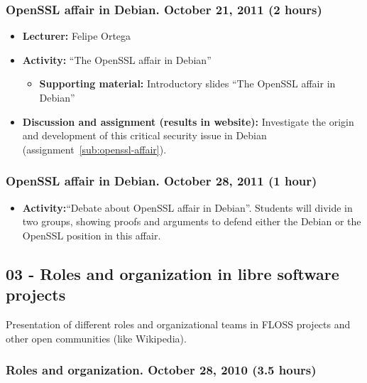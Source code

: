 \documentclass[a4paper]{article}
\begin{document}
\subsubsection{OpenSSL affair in Debian. October 21, 2011 (2 hours)}

\begin{itemize}
\item \textbf{Lecturer:} Felipe Ortega
\item \textbf{Activity:} ``The OpenSSL affair in Debian''
  \begin{itemize}
  \item \textbf{Supporting material:} Introductory slides ``The OpenSSL affair in Debian''
  \end{itemize}
\item \textbf{Discussion and assignment (results in website):} Investigate the origin and development of this critical security issue in Debian (assignment~\ref{sub:openssl-affair}).
\end{itemize}

\subsubsection{OpenSSL affair in Debian. October 28, 2011 (1 hour)}

\begin{itemize}
 \item \textbf{Activity:}``Debate about OpenSSL affair in Debian''. Students will divide in two groups, showing proofs and arguments to defend either the Debian
or the OpenSSL position in this affair.
\end{itemize}


\subsection{03 - Roles and organization in libre software projects}

Presentation of different roles and organizational teams in FLOSS projects and other open communities (like Wikipedia).

\subsubsection{Roles and organization. October 28, 2010 (3.5 hours)}
\end{document}
